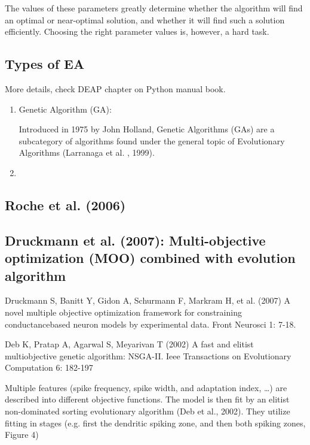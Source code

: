 The values of these parameters greatly determine whether the algorithm will find
an optimal or near-optimal solution, and whether it will find such a solution
efficiently. Choosing the right parameter values is, however, a hard task.

\subsection{Types of EA}

More details, check DEAP chapter on Python manual book.

\begin{enumerate}
  \item Genetic Algorithm (GA):

Introduced in 1975 by John Holland, Genetic Algorithms (GAs) are a subcategory
of algorithms found under the general topic of Evolutionary Algorithms
(Larranaga et al. , 1999).

  \item
\end{enumerate}

\subsection{Roche et al. (2006)}


\subsection{Druckmann et al. (2007): Multi-objective optimization (MOO) combined
with evolution algorithm}
\label{sec:MOO-evolutionary-algorithm}

Druckmann S, Banitt Y, Gidon A, Schurmann F, Markram H, et al. (2007) A
novel multiple objective optimization framework for constraining conductancebased
neuron models by experimental data. Front Neurosci 1: 7-18.

Deb K, Pratap A, Agarwal S, Meyarivan T (2002) A fast and elitist
multiobjective genetic algorithm: NSGA-II. Ieee Transactions on Evolutionary
Computation 6: 182-197

Multiple features (spike frequency, spike width, and adaptation index, \ldots)
are described into different objective functions. The model is then fit by an
elitist non-dominated sorting evolutionary algorithm (Deb et al., 2002). They
utilize fitting in stages (e.g. first the dendritic spiking zone, and then both
spiking zones, Figure 4)

